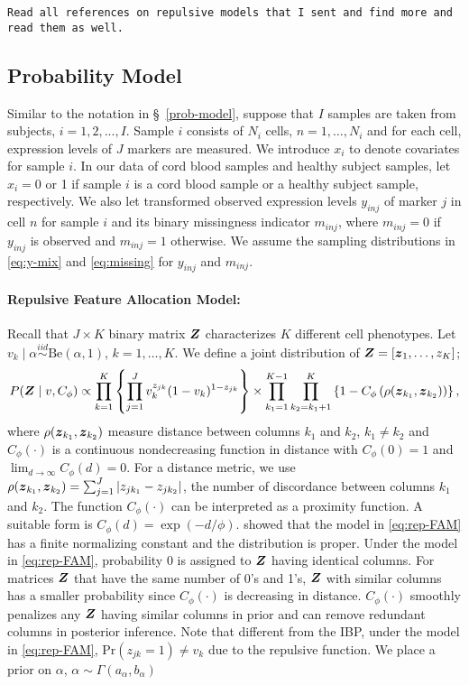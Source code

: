 \documentclass[12pt,]{article}
\newcommand{\p}[1]{\left(#1\right)}
\newcommand{\bc}[1]{ \left\{#1\right\} }
\newcommand{\abs}[1]{ \left|#1\right| }
\newcommand{\iid}{\overset{iid}{\sim}}
\def\Be{\text{Be}}
\def\Prob{\text{Pr}}
\newcommand{\bZ}{\mbox{\boldmath $Z$}}
\newcommand{\bz}{\mbox{\boldmath $z$}}
\begin{document}
{\tt Read all references on repulsive models that I sent and find more and read
them as well.  }


\subsection{Probability Model}\label{sec:rep-model}
Similar to the notation in \S~\ref{prob-model}, suppose that $I$ samples are
taken from subjects, \(i = 1,2,...,I\). Sample \(i\)
consists of \(N_i\) cells, \(n=1, \ldots, N_i\) and for each cell,
expression levels of \(J\) markers are measured.  We introduce $x_i$ to denote
covariates for sample $i$.  In our data of cord blood samples and healthy
subject samples, let $x_i=0$ or 1 if sample $i$ is a cord blood sample or a
healthy subject sample, respectively.  We also let transformed observed
expression levels $y_{inj}$ of marker $j$ in cell $n$ for sample $i$ and its
binary missingness indicator $m_{inj}$, where $m_{inj} = 0$ if $y_{inj}$ is
observed and $m_{inj} = 1$ otherwise.  We assume the sampling distributions in
\eqref{eq:y-mix} and \eqref{eq:missing} for $y_{inj}$ and $m_{inj}$.

\paragraph*{Repulsive Feature Allocation Model:} Recall that $J\times K$ binary
matrix $\bZ$ characterizes $K$ different cell phenotypes.  Let $v_k \mid \alpha
\iid \Be(\alpha, 1)$, $k=1, \ldots, K.$ We define a joint distribution of
$\bZ=[\bz_1, \ldots, z_K]$;
\begin{eqnarray}
P(\bZ \mid v, C_\phi) \propto \prod_{k=1}^K  \bc{\prod_{j=1}^J
v_k^{z_{jk}}(1-v_k)^{1-z_{jk}}} \times
\prod_{k_1=1}^{K-1}\prod_{k_2=k_1+1}^{K} \left\{1 - C_\phi\p{\rho(\bz_{k_1},
\bz_{k_2})}\right\},  \label{eq:rep-FAM}
\end{eqnarray}
where $\rho(\bz_{k_1}, \bz_{k_2})$ measure distance between columns $k_1$ and
$k_2$, $k_1 \neq k_2$ and $C_\phi(\cdot)$ is a continuous nondecreasing
function in distance with $C_\phi(0)=1$ and
$\lim_{d\rightarrow\infty}C_\phi(d)= 0$. For a distance metric, we use
$\rho(\bz_{k_1}, \bz_{k_2})=\sum_{j=1}^J \abs{z_{jk_1} - z_{jk_2}}$, the number
of discordance between columns $k_1$ and $k_2$.  The function $C_\phi(\cdot)$
can be interpreted as a proximity function. A suitable form is $C_\phi(d) =
\exp\p{-d/\phi}$. \cite{quinlan2017parsimonious} showed that the model in
\eqref{eq:rep-FAM} has a finite normalizing constant and the distribution is
proper.  Under the model in \eqref{eq:rep-FAM}, probability 0 is assigned to
$\bZ$ having identical columns.  For matrices $\bZ$ that have the same number
of 0's and 1's, $\bZ$ with similar columns has a smaller probability since
$C_\phi(\cdot)$ is decreasing in distance. $C_\phi(\cdot)$ smoothly penalizes
any $\bZ$ having similar columns in prior and can remove redundant columns in
posterior inference. Note that different from the IBP, under the model in
\eqref{eq:rep-FAM}, $\Prob(z_{jk}=1) \neq v_k$ due to the repulsive function.
We place a prior on $\alpha$, $\alpha \sim \Gamma(a_\alpha, b_\alpha)$
\end{document}
